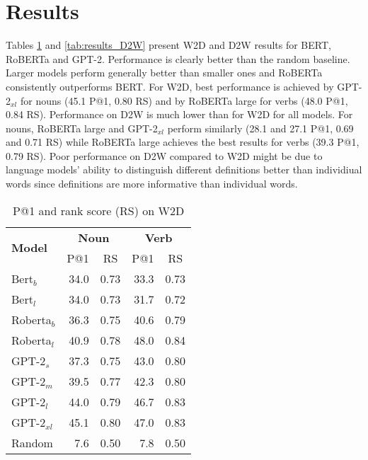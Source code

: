 \documentclass[11pt,a4paper]{article}
\begin{document}
\section{Results}

Tables \ref{tab:results_W2D} and 
\ref{tab:results_D2W} present
W2D and D2W
results for
BERT, RoBERTa and GPT-2. Performance is clearly better than the
random baseline.
Larger models perform generally better than smaller
ones and RoBERTa consistently outperforms BERT.
For W2D,
best performance is achieved by GPT-2$_{xl}$  for 
nouns (45.1 P@1, 0.80 RS) and by RoBERTa large
for  verbs (48.0 P@1, 0.84 RS). Performance on D2W is much lower than for W2D for all models. For nouns, RoBERTa large and GPT-2$_{xl}$ perform similarly (28.1 and 27.1 P@1, 0.69 and 0.71 RS) while RoBERTa large achieves the best results for verbs (39.3 P@1, 0.79 RS).
Poor performance on D2W compared to W2D might be due to language models' ability to distinguish different definitions better than individiual words since definitions are more informative  than individual words. 


\begin{table}
    \centering
    \begin{tabular}{l|rrrr}
        \hline
         \multirow{2}{*}{\textbf{Model}} & \multicolumn{2}{c}{\textbf{Noun}} & \multicolumn{2}{c}{\textbf{Verb}} \\
         & \multicolumn{1}{c}{P@1} & \multicolumn{1}{c}{RS} & \multicolumn{1}{c}{P@1} & \multicolumn{1}{c}{RS} \\ \hline
     Bert$_{b}$ & 34.0 & 0.73 & 33.3 & 0.73 \\
     Bert$_{l}$ & 34.0 & 0.73 & 31.7 & 0.72 \\
     Roberta$_{b}$ & 36.3 & 0.75 & 40.6 & 0.79 \\
     Roberta$_{l}$ & 40.9 & 0.78 & 48.0 & 0.84 \\ \hline
     GPT-2$_{s}$ & 37.3 & 0.75 & 43.0 & 0.80 \\
     GPT-2$_{m}$ & 39.5 & 0.77 & 42.3 & 0.80 \\
     GPT-2$_{l}$ & 44.0 & 0.79 & 46.7 & 0.83 \\
     GPT-2$_{xl}$ & 45.1 & 0.80 & 47.0 & 0.83 \\ \hline 
     Random & 7.6 & 0.50 & 7.8 & 0.50 \\\hline
     
    \end{tabular}
    \caption{P@1 and rank score (RS) on W2D}
    \label{tab:results_W2D}
\end{table}
\end{document}
